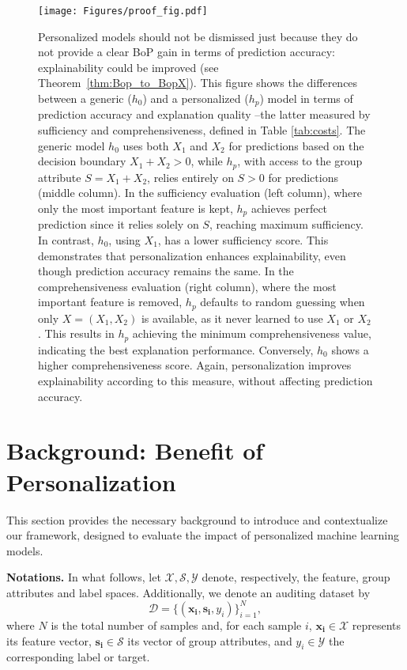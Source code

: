  \begin{figure*}
    \centering
    \texttt{[image: Figures/proof\_fig.pdf]}
    \vspace{-2em}
    \caption{Personalized models should not be dismissed just because they do not provide a clear BoP gain in terms of prediction accuracy: explainability could be improved (see Theorem~\ref{thm:Bop_to_BopX}). 
    This figure shows the differences between a generic (\(h_0\)) and a personalized (\(h_p\)) model in terms of prediction accuracy and explanation quality --the latter measured by sufficiency and comprehensiveness, defined in Table \ref{tab:costs}. The generic model \(h_0\) uses both \(X_1\) and \(X_2\) for predictions based on the decision boundary \(X_1 + X_2 > 0\), while \(h_p\), with access to the group attribute \(S = X_1 + X_2\), relies entirely on \(S > 0\) for predictions (middle column). In the sufficiency evaluation (left column), where only the most important feature is kept, \(h_p\) achieves perfect prediction since it relies solely on \(S\), reaching maximum sufficiency. In contrast, \(h_0\), using \(X_1\), has a lower sufficiency score. This demonstrates that personalization enhances explainability, even though prediction accuracy remains the same. In the comprehensiveness evaluation (right column), where the most important feature is removed, \(h_p\) defaults to random guessing when only \(X = (X_1, X_2)\) is available, as it never learned to use \(X_1\) or \(X_2\). This results in \(h_p\) achieving the minimum comprehensiveness value, indicating the best explanation performance. Conversely, \(h_0\) shows a higher comprehensiveness score. Again, personalization improves explainability according to this measure, without affecting prediction accuracy.}
    \label{fig:proof_fig}
    \vspace{-0.5em}
\end{figure*}

\section{Background: Benefit of Personalization}\label{sec:framework}

This section provides the necessary background to introduce and contextualize our framework, designed to evaluate the impact of personalized machine learning models.


\begin{tcolorbox}[
    colback=white,
    colframe=black,
    boxrule=0.5pt,
    left=5pt,
    right=5pt,
    top=5pt,
    bottom=5pt,
    boxsep=0pt,
    arc=10pt,
    outer arc=10pt
]
\textbf{Notations.} In what follows, let $\mathcal{X}, \mathcal{S}, \mathcal{Y}$ denote, respectively, the feature, group attributes and label spaces. Additionally, we denote an auditing dataset by
$$\mathcal{D} = \{ (\mathbf{x_i}, \mathbf{s_i}, y_i) \}_{i=1}^N,$$
where $N$ is the total number of samples and, for each sample $i$, $\mathbf{x_i}\in \mathcal{X}$ represents its feature vector, $ \mathbf{s_i}\in \mathcal{S}$ its vector of group attributes, and $y_i \in \mathcal{Y}$ the corresponding label or target.
\end{tcolorbox}



